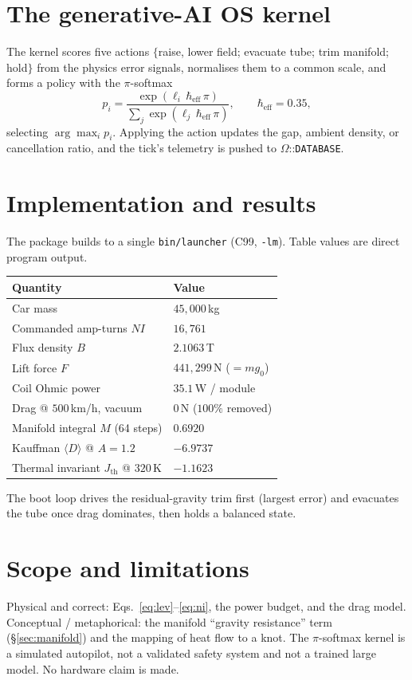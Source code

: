 \documentclass[11pt]{article}
\begin{document}
\section{The generative-AI OS kernel}
The kernel scores five actions
$\{$raise, lower field; evacuate tube; trim manifold; hold$\}$ from the physics
error signals, normalises them to a common scale, and forms a policy with the
$\pi$-softmax
\begin{equation}
p_i=\frac{\exp(\ell_i\,\hbar_{\text{eff}}\,\pi)}{\sum_j\exp(\ell_j\,\hbar_{\text{eff}}\,\pi)},
\qquad \hbar_{\text{eff}}=0.35,
\end{equation}
selecting $\arg\max_i p_i$. Applying the action updates the gap, ambient density,
or cancellation ratio, and the tick's telemetry is pushed to
$\Omega$::\texttt{DATABASE}.

\section{Implementation and results}
The package builds to a single \texttt{bin/launcher} (C99, \texttt{-lm}). Table
values are direct program output.
\begin{center}
\begin{tabular}{l l}
\hline
Quantity & Value\\\hline
Car mass & $45{,}000\,$kg\\
Commanded amp-turns $NI$ & $16{,}761$\\
Flux density $B$ & $2.1063\,$T\\
Lift force $F$ & $441{,}299\,$N ($=m g_0$)\\
Coil Ohmic power & $35.1\,$W / module\\
Drag @ $500\,$km/h, vacuum & $0\,$N ($100\%$ removed)\\
Manifold integral $M$ (64 steps) & $0.6920$\\
Kauffman $\langle D\rangle$ @ $A{=}1.2$ & $-6.9737$\\
Thermal invariant $J_{\text{th}}$ @ $320\,$K & $-1.1623$\\
\hline
\end{tabular}
\end{center}
The boot loop drives the residual-gravity trim first (largest error) and
evacuates the tube once drag dominates, then holds a balanced state.

\section{Scope and limitations}
\label{sec:scope}
Physical and correct: Eqs.~\eqref{eq:lev}--\eqref{eq:ni}, the power budget, and
the drag model. Conceptual / metaphorical: the manifold ``gravity resistance''
term (\S\ref{sec:manifold}) and the mapping of heat flow to a knot. The
$\pi$-softmax kernel is a simulated autopilot, not a validated safety system and
not a trained large model. No hardware claim is made.
\end{document}
